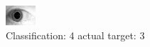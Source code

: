 \begin{figure}[h!]
\begin{center}
\includegraphics[width=0.60\columnwidth]{figures/ID1879_class_4_target_3.png}
\end{center}
\caption{ Classification: 4 actual target: 3}
\label{fig:ID1879_class_4_target_3}
\end{figure}
